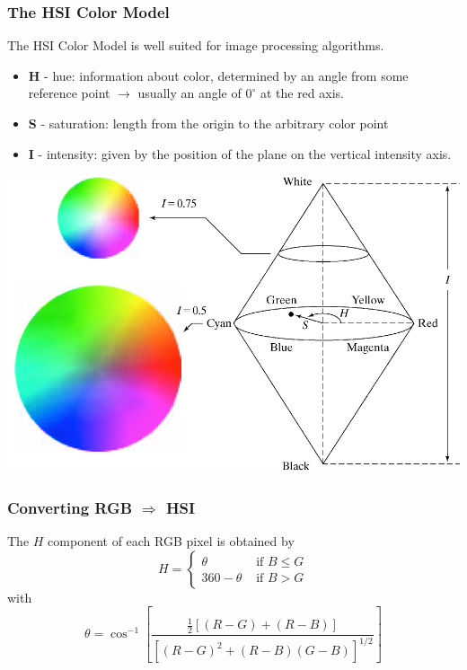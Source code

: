 \subsubsection{The HSI Color Model }
The HSI Color Model is well suited for image processing algorithms.\\
\begin{minipage}{0.6\textwidth}
\begin{itemize}
	\item \textbf{H} - hue: information about color, determined by an angle from some reference point $\rightarrow$ usually an angle of $0^\circ$ at the red axis.
	\item \textbf{S} - saturation: length from the origin to the arbitrary color point
	\item \textbf{I} - intensity: given by the position of the plane on the vertical intensity axis.
\end{itemize}
\end{minipage}
\hspace{0.05\textwidth}
\begin{minipage}{0.35\textwidth}
	\includegraphics[width = \textwidth]{./images/HSI_ColorSpace}
\end{minipage}

\subsubsection{Converting RGB $\Rightarrow$ HSI }
The $H$ component of each RGB pixel is obtained by
\begin{equation}
	H = \begin{cases}
			\theta & \text{ if } B \leq G \\
			360 - \theta & \text{ if } B > G
		\end{cases}
\end{equation}
with
\begin{equation}
	\theta = \cos^{-1} \left[ \frac{\frac{1}{2} \left[ (R-G) + (R-B) \right]}{\left[(R-G)^2 + (R-B)(G-B)\right]^{1/2}} \right]
\end{equation}

